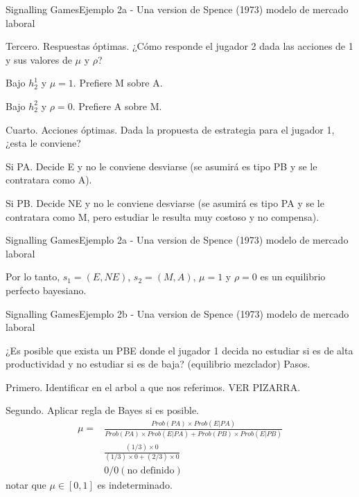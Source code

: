 \documentclass[notes, 11pt]{beamer} %
\newenvironment{wideitemize}{\itemize\addtolength{\itemsep}{10pt}}{\enditemize}
\begin{document}
\begin{frame}{Signalling Games}{Ejemplo 2a - Una version de Spence (1973) modelo de mercado laboral}
	\begin{wideitemize}
		\item<1-> Tercero. Respuestas \'optimas. ¿C\'omo responde el jugador 2 dada las acciones de 1 y sus valores de $\mu$ y $\rho$? 
		\begin{wideitemize}
			\item<2->[--] Bajo $h_{2}^{1}$ y $\mu = 1$. Prefiere M sobre A.
			\item<3->[--] Bajo $h_{2}^{2}$ y $\rho = 0$. Prefiere A sobre M.
		\end{wideitemize}
		\item<4-> Cuarto. Acciones \'optimas. Dada la propuesta de estrategia para el jugador 1, ¿esta le conviene?
		\begin{wideitemize}
			\item<5->[--] Si PA. Decide E y no le conviene desviarse (se asumir\'a es tipo PB y se le contratara como A).
			\item<6->[--] Si PB. Decide NE y no le conviene desviarse (se asumir\'a es tipo PA y se le contratara como M, pero estudiar le resulta muy costoso y no compensa).
		\end{wideitemize}
	\end{wideitemize}
\end{frame}

\begin{frame}{Signalling Games}{Ejemplo 2a - Una version de Spence (1973) modelo de mercado laboral}
	\begin{wideitemize}
		\item<1-> Por lo tanto, $s_{1} = (E,NE)$, $s_{2} = (M,A)$, $\mu = 1$ y $\rho = 0$ es un equilibrio perfecto bayesiano.
	\end{wideitemize}
\end{frame}

\begin{frame}{Signalling Games}{Ejemplo 2b - Una version de Spence (1973) modelo de mercado laboral}
	\begin{wideitemize}
		\item<1-> ¿Es posible que exista un PBE donde el jugador 1 decida no estudiar si es de alta productividad y no estudiar si es de baja? (equilibrio mezclador) Pasos.
		\item<2-> Primero. Identificar en el arbol a que nos referimos. VER PIZARRA.
		\item<3-> Segundo. Aplicar regla de Bayes si es posible. 
		\begin{align*}
			\mu = & \frac{ Prob(PA) \times Prob(E|PA) }{ Prob(PA)\times Prob(E|PA) + Prob(PB)\times Prob(E|PB) } \\
			& \frac{ (1/3) \times 0 }{ (1/3) \times 0 + (2/3) \times 0 } \\
			& 0/0 (\text{no definido}) 
		\end{align*} notar que $\mu \in [0,1]$ es indeterminado.
	\end{wideitemize}
\end{frame}
\end{document}
